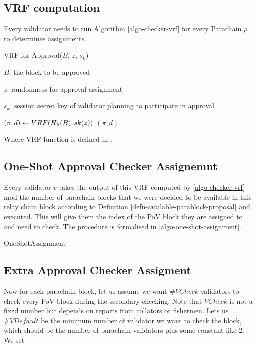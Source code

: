 {\subsection{VRF computation}
\label{sect-vrf-comp}

Every validator needs to run Algorithm \ref{algo-checker-vrf} for every Parachain $\rho$ to determines assignments.  

\begin{algorithm}
  \caption[VRF-for-Approval]{\sc VRF-for-Approval($B$, $z$, $s_k$)}
  \label{algo-checker-vrf}
  \begin{algorithmic}[1]
  \Require

    $B$: the block to be approved 

    $z$: randomness for approval assignment

    $s_k$: session secret key of validator planning to participate in approval

    \State $(\pi, d) \leftarrow {\sc VRF}(H_h(B),sk(z))$
    \State \Return $(\pi,d)$
  \end{algorithmic}
\end{algorithm}

Where {\sc VRF} function is defined in \cite{polkadot-crypto-spec}.

\subsection{One-Shot Approval Checker Assignemnt}
\label{sect-shot-assignment}
Every validator $v$ takes the output of this VRF computed by \ref{algo-checker-vrf} mod the number of parachain blocks that we were decided to be available in this relay chain block according to Definition \ref{defn-available-parablock-proposal} and executed. This will give them the index of the PoV block they are assigned to and need to check. The procedure is formalised in \ref{algo-one-shot-assignment}.

\begin{algorithm}
  \caption[]{\sc OneShotAssignment}
  \label{algo-one-shot-assignment}
  \begin{algorithmic}[1]
    \Require{}
    
    \State \TBS
  \end{algorithmic}
\end{algorithm}

\subsection{Extra Approval Checker Assigment}
\label{sect-extra-validation}
Now for each parachain block, let us assume we want $\#VCheck$ validators to check every PoV block during the secondary checking. Note that $VCheck$ is not a fixed number but depends on reports from collators or fishermen. Lets us $\#VDefault$ be the minimum number of validator we want to check the block, which should be the number of parachain validators plus some constant like $2$.  We set

}
